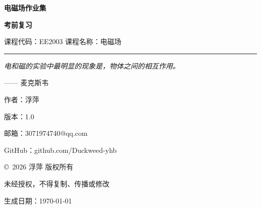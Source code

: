 \begin{titlepage}
    \centering
    \vspace*{2cm}
    
    {\Huge \bfseries 电磁场作业集 \par}
    \vspace{0.8cm}
    
    {\Large \bfseries 考前复习 \par}
    \vspace{0.4cm}
    {\Large 课程代码：EE2003 \quad 课程名称：电磁场 \par}
    \vspace{0.6cm}
    
    \rule{\linewidth}{0.2mm}
    \vspace{1cm}
    
    {\itshape \large 电和磁的实验中最明显的现象是，物体之间的相互作用。\par}
    \vspace{0.4cm}
    {\large —— 麦克斯韦 \par}
    \vspace{1.2cm}
    
    {\Large 作者：浮萍 \par}
    \vspace{0.3cm}
    {\Large 版本：1.0 \par}
    \vspace{0.3cm}
    {\Large 邮箱：3071974740@qq.com \par}
    \vspace{0.3cm}
    {\Large GitHub：github.com/Duckweed-yhb \par}
    \vspace{1cm}
    
    {\large \copyright\ 2026 浮萍 版权所有 \par}
    {\large 未经授权，不得复制、传播或修改 \par}
    \vspace{0.5cm}
    
    \vfill
    {\large 生成日期：\today \par}
\end{titlepage}

